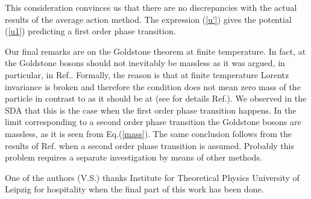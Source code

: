 \documentclass[a4paper,12pt]{article}
\begin{document}
This consideration convinces us that there are no discrepancies with
the actual results of the average action method. The expression
(\ref{u'}) gives the potential (\ref{u1}) predicting a first order
phase transition.

Our final remarks are on the Goldstone theorem at finite temperature.
In fact, at \coordHE{} the Goldstone bosons should not inevitably be
massless as it was argued, in particular, in
Ref.\cite{Kowalski}. Formally, the reason is that at finite
temperature Lorentz invariance is broken and therefore the condition
\coordHE{} does not mean zero mass of the particle in contrast to as it
should be at \coordHE{} (see for details Ref.\cite{Kowalski}).  We
observed in the SDA that this is the case when the first order phase
transition happens. In the limit \coordHE{} corresponding to a
second order phase transition the Goldstone bosons are massless, as it
is seen from Eq.(\ref{mass}). The same conclusion follows from the
results of Ref.\cite{Reuter} when a second order phase transition is
assumed. Probably this problem requires a separate investigation by
means of other methods.

One of the authors (V.S.) thanks Institute for Theoretical Physics
University of Leipzig for hospitality when the final part of this work
has been done.
\end{document}
